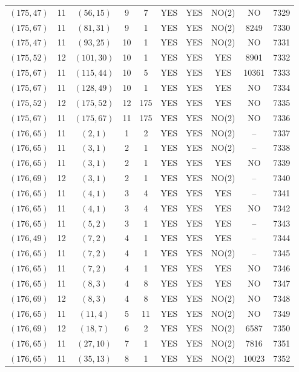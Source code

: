 \begin{longtable}{|c|c|c|c|c|c|c|c|c|c|}
$(175, 47)$ & 11 & $(56, 15)$ & 9 & 7 & YES & YES & NO(2) & NO & 7329\\
$(175, 67)$ & 11 & $(81, 31)$ & 9 & 1 & YES & YES & NO(2) & 8249 & 7330\\
$(175, 47)$ & 11 & $(93, 25)$ & 10 & 1 & YES & YES & NO(2) & NO & 7331\\
$(175, 52)$ & 12 & $(101, 30)$ & 10 & 1 & YES & YES & YES & 8901 & 7332\\
$(175, 67)$ & 11 & $(115, 44)$ & 10 & 5 & YES & YES & YES & 10361 & 7333\\
$(175, 67)$ & 11 & $(128, 49)$ & 10 & 1 & YES & YES & YES & NO & 7334\\
$(175, 52)$ & 12 & $(175, 52)$ & 12 & 175 & YES & YES & YES & NO & 7335\\
$(175, 67)$ & 11 & $(175, 67)$ & 11 & 175 & YES & YES & NO(2) & NO & 7336\\
$(176, 65)$ & 11 & $(2, 1)$ & 1 & 2 & YES & YES & NO(2) & -- & 7337\\
$(176, 65)$ & 11 & $(3, 1)$ & 2 & 1 & YES & YES & NO(2) & -- & 7338\\
$(176, 65)$ & 11 & $(3, 1)$ & 2 & 1 & YES & YES & YES & NO & 7339\\
$(176, 69)$ & 12 & $(3, 1)$ & 2 & 1 & YES & YES & NO(2) & -- & 7340\\
$(176, 65)$ & 11 & $(4, 1)$ & 3 & 4 & YES & YES & YES & -- & 7341\\
$(176, 65)$ & 11 & $(4, 1)$ & 3 & 4 & YES & YES & YES & NO & 7342\\
$(176, 65)$ & 11 & $(5, 2)$ & 3 & 1 & YES & YES & YES & -- & 7343\\
$(176, 49)$ & 12 & $(7, 2)$ & 4 & 1 & YES & YES & YES & -- & 7344\\
$(176, 65)$ & 11 & $(7, 2)$ & 4 & 1 & YES & YES & NO(2) & -- & 7345\\
$(176, 65)$ & 11 & $(7, 2)$ & 4 & 1 & YES & YES & YES & NO & 7346\\
$(176, 65)$ & 11 & $(8, 3)$ & 4 & 8 & YES & YES & YES & NO & 7347\\
$(176, 69)$ & 12 & $(8, 3)$ & 4 & 8 & YES & YES & NO(2) & NO & 7348\\
$(176, 65)$ & 11 & $(11, 4)$ & 5 & 11 & YES & YES & NO(2) & NO & 7349\\
$(176, 69)$ & 12 & $(18, 7)$ & 6 & 2 & YES & YES & NO(2) & 6587 & 7350\\
$(176, 65)$ & 11 & $(27, 10)$ & 7 & 1 & YES & YES & NO(2) & 7816 & 7351\\
$(176, 65)$ & 11 & $(35, 13)$ & 8 & 1 & YES & YES & NO(2) & 10023 & 7352\\

\end{longtable}
